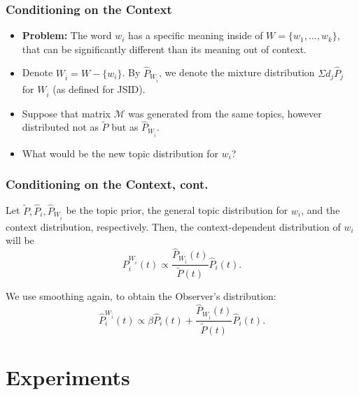 \documentclass{beamer}
\newcommand\bet{\begin{Theorem}}
\newcommand\eet{\end{Theorem}}
\newcommand\bed{\begin{Definition}}
\newcommand\eed{\end{Definition}}
\newcommand\cM{{\mathcal M}}
\begin{document}
\begin{frame}
\frametitle{Conditioning on the Context}
\begin{itemize}
 \item {\bf Problem:} The word $w_i$ has a specific meaning inside of
   $W=\{w_1,...,w_k\}$, that can be significantly different than its
   meaning out of context. 
\item Denote $W_{\bar{i}}=W-\{w_i\}$. By $\widehat{P}_{W_{\bar{i}}}$, we denote
  the mixture distribution $\Sigma d_j\widehat{P}_j$ for $W_{\bar{i}}$
  (as defined for JSID).
\item Suppose that matrix $\cM$ was generated from the same topics, however
  distributed not as $\tilde{P}$ but as
  $\widehat{P}_{W_{\bar{i}}}$.
\item What would be the new topic distribution for $w_i$?
\end{itemize}
\end{frame}

\begin{frame}
\frametitle{Conditioning on the Context, cont.}
\bet
Let $\tilde{P},\widehat{P}_{i}, \widehat{P}_{W_{\bar{i}}}$ be the
topic prior, the general
topic distribution for $w_i$, and the context distribution,
respectively. Then, the context-dependent distribution of $w_i$ will
be 
\vspace{-2mm}
\begin{equation*}
P^{W_{\bar{i}}}_{i}(t)\propto \frac{\widehat{P}_{W_{\bar{i}}}(t)}{\tilde{P}(t)}\widehat{P}_{i}(t).
\end{equation*}
\eet
\bed
We use smoothing again, to obtain the Observer's distribution:
\vspace{-2mm}
\[\widehat{P}^{W_{\bar{i}}}_{i}(t)\propto \beta \widehat{P}_{i}\!(t)
+\frac{\widehat{P}_{W_{\bar{i}}}(t)}{\tilde{P}(t)}\widehat{P}_{i}(t).\] 
\eed
\end{frame}

\section{Experiments}
\end{document}
